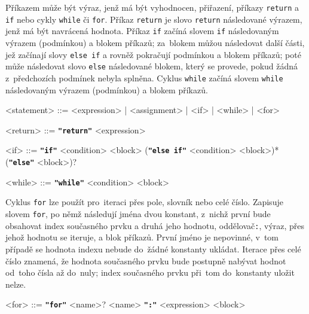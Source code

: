 \documentclass[a4paper,12pt]{article}
\def\quote #1{"#1"}
\def\emphasis #1{\textbf{\texttt{\quote{#1}}}}
\begin{document}
Příkazem může být výraz, jenž má být vyhodnocen, přiřazení, příkazy \texttt{return} a \texttt{if} nebo cykly \texttt{while} či \texttt{for}. Příkaz \texttt{return} je slovo \texttt{return} následované výrazem, jenž má být navrácená hodnota. Příkaz \texttt{if} začíná slovem \texttt{if} následovaným výrazem (podmínkou) a blokem příkazů; za~blokem můžou následovat další části, jež začínají slovy \texttt{else if} a rovněž pokračují podmínkou a blokem příkazů; poté může následovat slovo \texttt{else} následované blokem, který se provede, pokud žádná z~předchozích podmínek nebyla splněna. Cyklus \texttt{while} začíná slovem \texttt{while} následovaným výrazem (podmínkou) a blokem příkazů.
\begin{grammar}
<statement> ::= <expression> | <assignment> | <if> | <while> | <for>

<return> ::= \emphasis{return} <expression>

<if> ::= \emphasis{if} <condition> <block> (\emphasis{else if} <condition> <block>)* (\emphasis{else} <block>)?

<while> ::= \emphasis{while} <condition> <block>
\end{grammar}

Cyklus \texttt{for} lze použít pro~iteraci přes pole, slovník nebo celé číslo. Zapisuje slovem \texttt{for}, po němž následují jména dvou konstant, z~nichž první bude obsahovat index současného prvku a druhá jeho hodnotu, oddělovač\texttt{:}, výraz, přes jehož hodnotu se iteruje, a blok příkazů. První jméno je nepovinné, v~tom případě se hodnota indexu nebude do~žádné konstanty ukládat. Iterace přes celé číslo znamená, že hodnota současného prvku bude postupně nabývat hodnot od~toho čísla až do~nuly; index současného prvku při~tom do~konstanty uložit nelze.
\begin{grammar}
<for> ::= \emphasis{for} <name>? <name> \emphasis{:} <expression> <block>
\end{grammar}
\end{document}
